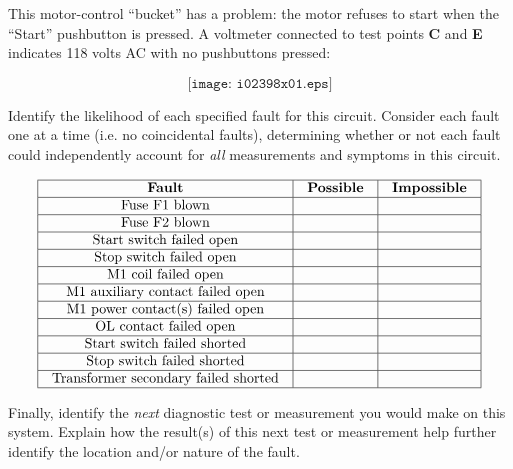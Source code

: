 

This motor-control ``bucket'' has a problem: the motor refuses to start when the ``Start'' pushbutton is pressed.  A voltmeter connected to test points {\bf C} and {\bf E} indicates 118 volts AC with no pushbuttons pressed:

$$\texttt{[image: i02398x01.eps]}$$

Identify the likelihood of each specified fault for this circuit.  Consider each fault one at a time (i.e. no coincidental faults), determining whether or not each fault could independently account for {\it all} measurements and symptoms in this circuit.


$$\vbox{\offinterlineskip
\halign{\strut
\vrule \quad\hfil # \ \hfil & 
\vrule \quad\hfil # \ \hfil & 
\vrule \quad\hfil # \ \hfil \vrule \cr
\noalign{\hrule}
%
{\bf Fault} & {\bf Possible} & {\bf Impossible} \cr
%
\noalign{\hrule}
%
Fuse F1 blown &  &  \cr
%
\noalign{\hrule}
%
Fuse F2 blown &  &  \cr
%
\noalign{\hrule}
%
Start switch failed open &  &  \cr
%
\noalign{\hrule}
%
Stop switch failed open &  &  \cr
%
\noalign{\hrule}
%
M1 coil failed open &  &  \cr
%
\noalign{\hrule}
%
M1 auxiliary contact failed open &  &  \cr
%
\noalign{\hrule}
%
M1 power contact(s) failed open &  &  \cr
%
\noalign{\hrule}
%
OL contact failed open &  &  \cr
%
\noalign{\hrule}
%
Start switch failed shorted &  &  \cr
%
\noalign{\hrule}
%
Stop switch failed shorted &  &  \cr
%
\noalign{\hrule}
%
Transformer secondary failed shorted &  &  \cr
%
\noalign{\hrule}
} %
}$$ %

Finally, identify the {\it next} diagnostic test or measurement you would make on this system.  Explain how the result(s) of this next test or measurement help further identify the location and/or nature of the fault.







